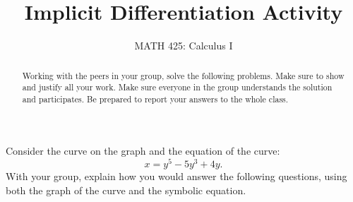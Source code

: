 \documentclass{ximera}
\title{Implicit Differentiation Activity}
\author{MATH 425: Calculus I}
\begin{document}
\begin{abstract}
    Working with the peers in your group, solve the following problems. Make sure to show and justify all your work. Make sure everyone in the group understands the solution and participates. Be prepared to report your answers to the whole class. 
\end{abstract}
\maketitle


\begin{exercise}
    Consider the curve on the graph and the equation of the curve: 
    $$x=y^5-5y^3+4y.$$
    With your group, explain how you would answer the following questions, using both the graph of the curve and the symbolic equation.
    \begin{image}
\end{image}
\end{exercise}
\end{document}
